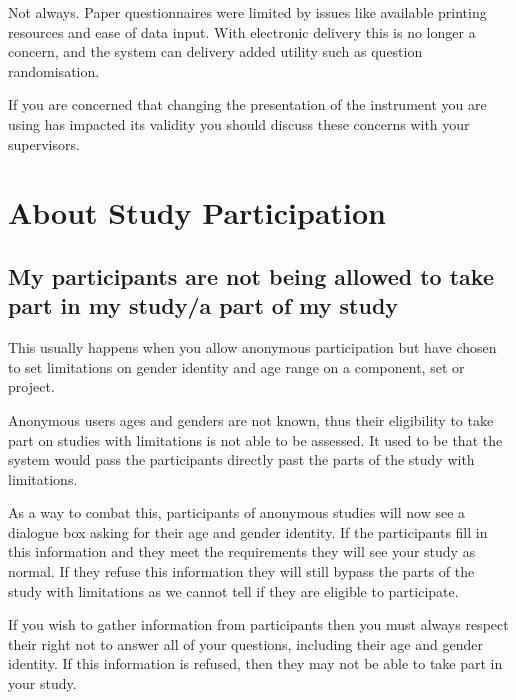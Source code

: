 \documentclass[]{book}
\begin{document}
Not always. Paper questionnaires were limited by issues like available printing resources and ease of data input. With electronic delivery this is no longer a concern, and the system can delivery added utility such as question randomisation.

If you are concerned that changing the presentation of the instrument you are using has impacted its validity you should discuss these concerns with your supervisors.

\hypertarget{about-study-participation}{%
\section*{About Study Participation}\label{about-study-participation}}

\hypertarget{my-participants-are-not-being-allowed-to-take-part-in-my-studya-part-of-my-study}{%
\subsection*{My participants are not being allowed to take part in my study/a part of my study}\label{my-participants-are-not-being-allowed-to-take-part-in-my-studya-part-of-my-study}}

This usually happens when you allow anonymous participation but have chosen to set limitations on gender identity and age range on a component, set or project.

Anonymous users ages and genders are not known, thus their eligibility to take part on studies with limitations is not able to be assessed. It used to be that the system would pass the participants directly past the parts of the study with limitations.

As a way to combat this, participants of anonymous studies will now see a dialogue box asking for their age and gender identity. If the participants fill in this information and they meet the requirements they will see your study as normal. If they refuse this information they will still bypass the parts of the study with limitations as we cannot tell if they are eligible to participate.

If you wish to gather information from participants then you must always respect their right not to answer all of your questions, including their age and gender identity. If this information is refused, then they may not be able to take part in your study.
\end{document}
